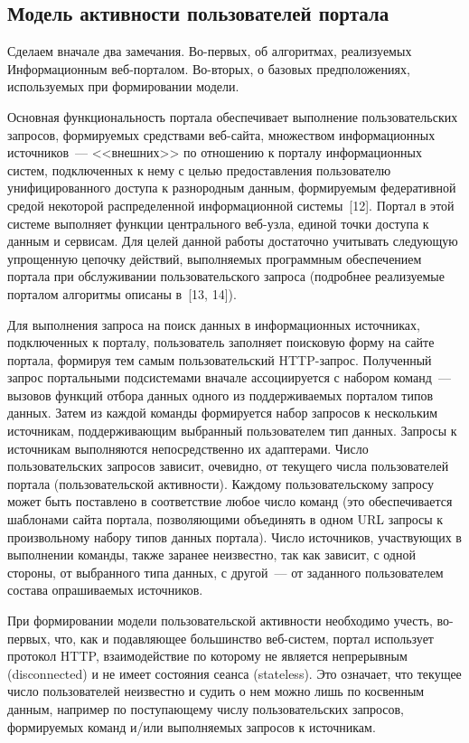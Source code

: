 \begin{multicols}{2}
\section{Модель активности пользователей портала}
  
  Сделаем вначале два замечания. Во-пер\-вых, об алгоритмах, реализуемых 
Информационным веб-пор\-та\-лом. Во-вто\-рых, о базовых предположениях, используемых 
при формировании модели.
  
  Основная функциональность портала обес\-пе\-чивает выполнение пользовательских 
запросов, формируемых средствами веб-сай\-та, множеством информационных 
  источников~--- <<внешних>> по отношению к порталу информационных сис\-тем, 
подключенных к нему с целью предоставления пользователю унифицированного доступа к 
разнородным данным, формируемым федеративной средой некоторой распределенной 
информационной сис\-те\-мы~[12]. Портал в этой сис\-те\-ме выполняет функции центрального 
веб-узла, единой точки доступа к данным и сервисам. Для целей данной работы достаточно 
учитывать следующую упрощенную цепочку действий, выполняемых программным 
обеспечением портала при обслуживании пользовательского запроса (подробнее 
реализуемые порталом алгоритмы описаны в~[13, 14]).
  
  Для выполнения запроса на поиск данных в информационных источниках, подключенных 
к порталу, пользователь заполняет поисковую форму на сайте портала, формируя тем самым 
пользовательский HTTP-за\-прос. Полученный запрос портальными под\-сис\-те\-ма\-ми вначале 
ассоциируется с набором команд~--- вызовов функций отбора данных одного из 
поддерживаемых порталом типов данных. Затем из каждой команды формируется набор\linebreak 
запросов к нескольким источникам, под\-дер\-жи\-ва\-ющим выбранный пользователем тип 
данных. Запро\-сы к источникам выполняются непосредственно их адаптерами. Чис\-ло 
пользовательских запросов зависит, очевидно, от текущего числа пользователей портала 
(пользовательской активности). Каждому пользовательскому запросу может быть поставлено 
в соответствие любое число команд (это обеспечивается шаблонами сайта портала, 
позволяющими объединять в одном URL запросы к произвольному набору типов данных 
портала). Число источников, участвующих в выполнении команды, также заранее 
неизвестно, так как зависит, с одной стороны, от выбранного типа данных, с другой~--- от 
заданного пользователем состава опрашиваемых источников.
  
  При формировании модели пользовательской активности необходимо учесть, во-пер\-вых, 
что, как и подавляющее большинство веб-сис\-тем, портал использует протокол HTTP, 
взаимодействие по которому не является непрерывным (disconnected) и не имеет состояния 
сеанса (stateless). Это означает, что текущее число пользователей неизвестно и судить о нем 
можно лишь по косвенным данным, например по поступающему числу пользовательских 
запросов, формируемых команд и/или вы\-пол\-ня\-емых запросов к источникам.
  

\end{multicols}
